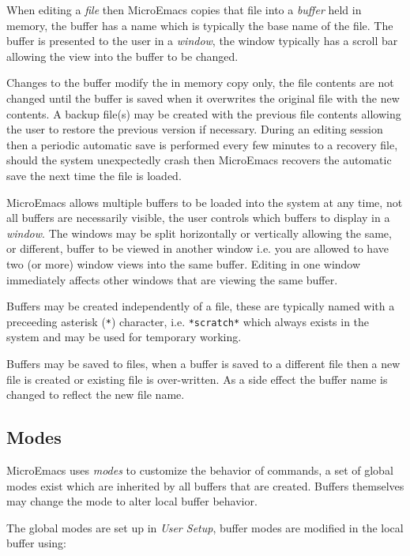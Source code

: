 \documentclass[11pt,a4paper,pdftex]{article}
\begin{document}
  When editing a \textit{file} then MicroEmacs copies that file into a
  \textit{buffer} held in memory, the buffer has a name which is typically the
  base name of the file. The buffer is presented to the user in a
  \textit{window}, the window typically has a scroll bar allowing the view
  into the buffer to be changed.

  Changes to the buffer modify the in memory copy only, the file contents are
  not changed until the buffer is saved when it overwrites the original file
  with the new contents. A backup file(s) may be created with the previous
  file contents allowing the user to restore the previous version if
  necessary. During an editing session then a periodic automatic save is
  performed every few minutes to a recovery file, should the system
  unexpectedly crash then MicroEmacs recovers the automatic save the next time
  the file is loaded.

  MicroEmacs allows multiple buffers to be loaded into the system at any time,
  not all buffers are necessarily visible, the user controls which buffers to
  display in a \textit{window}. The windows may be split horizontally or
  vertically allowing the same, or different, buffer to be viewed in another
  window i.e. you are allowed to have two (or more) window views into the same
  buffer. Editing in one window immediately affects other windows that are
  viewing the same buffer.

  Buffers may be created independently of a file, these are typically named
  with a preceeding asterisk (\texttt{*}) character, i.e. \texttt{*scratch*}
  which always exists in the system and may be used for temporary working.

  Buffers may be saved to files, when a buffer is saved to a different file
  then a new file is created or existing file is over-written. As a side
  effect the buffer name is changed to reflect the new file name.

\subsection{Modes}

  MicroEmacs uses \textit{modes} to customize the behavior of commands, a set
  of global modes exist which are inherited by all buffers that are created.
  Buffers themselves may change the mode to alter local buffer behavior.

  The global modes are set up in \textit{User Setup}, buffer modes are
  modified in the local buffer using:
\end{document}
